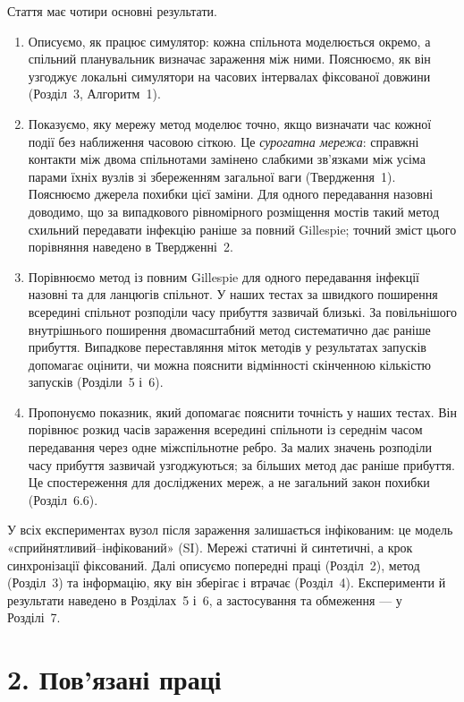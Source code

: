 ﻿\documentclass[11pt,a4paper]{article}
\begin{document}
Стаття має чотири основні результати.
\begin{enumerate}
\item Описуємо, як працює симулятор: кожна спільнота моделюється окремо, а спільний планувальник визначає зараження між ними. Пояснюємо, як він узгоджує локальні симулятори на часових інтервалах фіксованої довжини (Розділ~3, Алгоритм~1).
\item Показуємо, яку мережу метод моделює точно, якщо визначати час кожної події без наближення часовою сіткою. Це \emph{сурогатна мережа}: справжні контакти між двома спільнотами замінено слабкими зв'язками між усіма парами їхніх вузлів зі збереженням загальної ваги (Твердження~1). Пояснюємо джерела похибки цієї заміни. Для одного передавання назовні доводимо, що за випадкового рівномірного розміщення мостів такий метод схильний передавати інфекцію раніше за повний Gillespie; точний зміст цього порівняння наведено в Твердженні~2.
\item Порівнюємо метод із повним Gillespie для одного передавання інфекції назовні та для ланцюгів спільнот. У наших тестах за швидкого поширення всередині спільнот розподіли часу прибуття зазвичай близькі. За повільнішого внутрішнього поширення двомасштабний метод систематично дає раніше прибуття. Випадкове переставляння міток методів у результатах запусків допомагає оцінити, чи можна пояснити відмінності скінченною кількістю запусків (Розділи~5 і~6).
\item Пропонуємо показник, який допомагає пояснити точність у наших тестах. Він порівнює розкид часів зараження всередині спільноти із середнім часом передавання через одне міжспільнотне ребро. За малих значень розподіли часу прибуття зазвичай узгоджуються; за більших метод дає раніше прибуття. Це спостереження для досліджених мереж, а не загальний закон похибки (Розділ~6.6).
\end{enumerate}
У всіх експериментах вузол після зараження залишається інфікованим: це модель «сприйнятливий--інфікований» (SI). Мережі статичні й синтетичні, а крок синхронізації фіксований. Далі описуємо попередні праці (Розділ~2), метод (Розділ~3) та інформацію, яку він зберігає і втрачає (Розділ~4). Експерименти й результати наведено в Розділах~5 і~6, а застосування та обмеження --- у Розділі~7.
\clearpage
\section*{2. Пов'язані праці}
\end{document}
